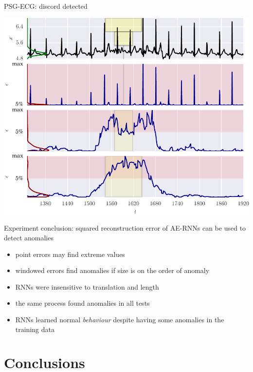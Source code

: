 \documentclass{beamer}
\begin{document}
    \begin{frame}{PSG-ECG: discord detected}

      \includegraphics[width=\textwidth]{figs/er_sleep.pdf}

    \end{frame}



    \begin{frame}{Experiment conclusion: squared reconstruction error of AE-RNNs can be used to detect anomalies}

      \begin{itemize}
        \item point errors may find extreme values
        \item windowed errors find anomalies if size is on the order of anomaly
        \item RNNs were insensitive to translation and length
        \item the same process found anomalies in all tests
        \item RNNs learned normal \emph{behaviour} despite having some anomalies in the training data
      \end{itemize}

    \end{frame}


    \section{Conclusions}
\end{document}
